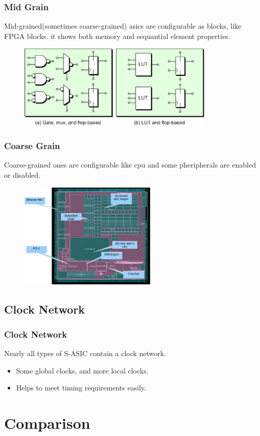 \documentclass{beamer}
\begin{document}
\frame
{
  \frametitle{Mid Grain}
  Mid-grained(sometimes coarse-grained) asics are configurable as blocks, like FPGA blocks.
  it shows both memory and sequantial element properties.
  \begin{figure}[H]
  \includegraphics[height=40mm]{images/mid_grained.eps}
  \end{figure}
}

\frame
{
  \frametitle{Coarse Grain}
  Coarse-grained ones are configurable like cpu and some pheripherals are enabled or disabled.
  \begin{figure}[H]
  \includegraphics[height=50mm]{images/coarse_grained.eps}
  \end{figure}
}

\subsection{Clock Network}
\frame
{
  \frametitle{Clock Network}
  Nearly all types of S-ASIC contain a clock network.
  \begin{itemize}
  \item Some global clocks, and more local clocks.
  \item Helps to meet timing requirements easily. 
  \end{itemize}
}


\section{Comparison}
\end{document}
